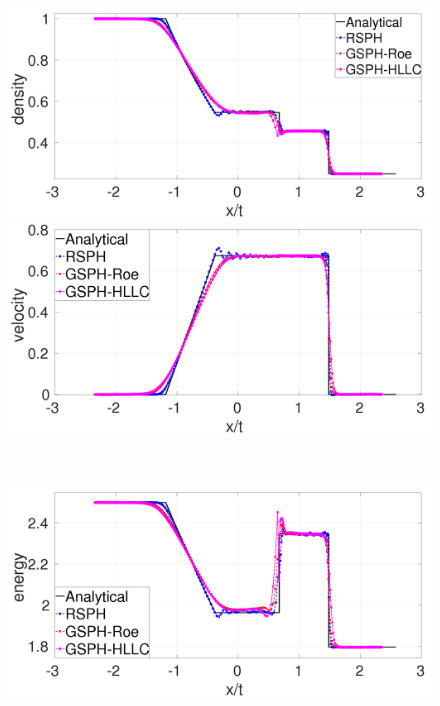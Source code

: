 \documentclass[review]{elsarticle}
\begin{document}
\begin{figure}[H]
    \centering
    \begin{minipage}{.495\textwidth}
        \centering
        \includegraphics[width=0.99 \textwidth,height=0.6\textwidth]{./Figures/RCM-Sod-GSPH-compare-rho}
    \end{minipage}%
    \begin{minipage}{.495 \textwidth}
        \centering
        \includegraphics[width=0.99 \textwidth,height=0.6\textwidth]{./Figures/RCM-Sod-GSPH-compare-v}
    \end{minipage}%
    \\
    \begin{minipage}{.495\textwidth}
        \centering
        \includegraphics[width=0.99 \textwidth,height=0.6\textwidth]{./Figures/RCM-Sod-GSPH-compare-e}

\end{minipage}
\end{figure}
\end{document}
